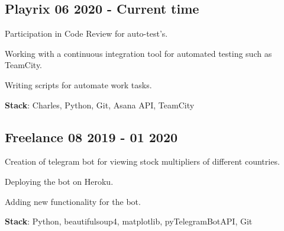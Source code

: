 \documentclass[a4paper,12pt]{article}
\begin{document}

\vspace*{2pt}

\subsection{{Playrix } \hfill 06 2020 - Current time}

\begin{zitemize}
\item Participation in Code Review for auto-test's.
\item Working with a continuous integration tool for automated testing such as TeamCity.
\item Writing scripts for automate work tasks.
\end{zitemize}

\vspace*{0.5pt} \textbf {Stack}: Charles, Python, Git, Asana API, TeamCity

\vspace*{8pt}

\subsection{{Freelance } \hfill 08 2019 - 01 2020}

\begin{zitemize}
\item Creation of telegram bot for viewing stock multipliers of different countries.
\item Deploying the bot on Heroku.
\item Adding new functionality for the bot.
\end{zitemize}
\vspace*{0.5pt} \textbf {Stack}: Python, beautifulsoup4, matplotlib, pyTelegramBotAPI, Git
\end{document}
